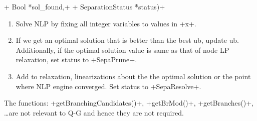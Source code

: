 \begin{enumerate}
\code+ Bool *sol_found,+ \code+ SeparationStatus *status)+
\begin{enumerate}
\item Solve NLP by fixing all integer variables to values in \code+x+. 
\item If we get an optimal solution that is better than the best ub, update
ub. Additionally, if the optimal solution value is same as that of node LP
relaxation, set status to \code+SepaPrune+.
\item Add to relaxation, linearizations about the the optimal solution or the
point where NLP engine converged. Set status to \code+SepaResolve+.
\end{enumerate}
\end{enumerate}

The functions:
\code+getBranchingCandidates()+, \code+getBrMod()+, \code+getBranches()+, 
\ldots are not relevant to Q-G and hence they are not required.

